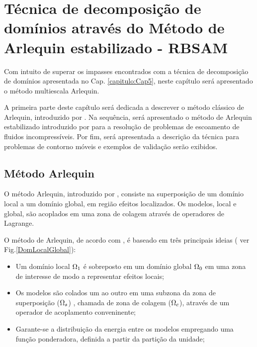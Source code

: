 \documentclass[tese_patricia]{subfiles}
\begin{document}

\chapter[Método de Arlequin estabilizado]{Técnica de decomposição de domínios através do Método de Arlequin estabilizado - RBSAM} \label{capitulo:Cap6}

Com intuito de superar os impasses encontrados com a técnica de decomposição de domínios apresentada no Cap. \ref{capitulo:Cap5}, neste capítulo será apresentado o método multiescala Arlequin.

A primeira parte deste capítulo será dedicada a descrever o método clássico de Arlequin, introduzido por . Na sequência, será apresentado o método de Arlequin estabilizado introduzido por   para a resolução de problemas de escoamento de fluidos incompressíveis. Por fim, será apresentada a descrição da técnica para problemas de contorno móveis e exemplos de validação serão exibidos.

\section{Método Arlequin}

O método Arlequin, introduzido por , consiste na superposição de um domínio local a um domínio global, em região efeitos localizados. Os modelos, local e global, são acoplados em uma zona de colagem através de operadores de Lagrange. 

O  método de Arlequin, de acordo com , é baseado em três principais ideias ( ver Fig.\ref{DomLocalGlobal}):

\begin{itemize}
	\item Um domínio local $\Omega_1$ é sobreposto em um domínio global  $\Omega_0$ em uma zona de interesse de modo a representar efeitos locais;
	\item Os modelos são colados um ao outro em uma subzona da zona de superposição ($\Omega_s$) , chamada de zona de colagem ($\Omega_c$), através de um operador de acoplamento conveninente;
	\item  Garante-se a distribuição da energia entre os modelos empregando uma função ponderadora, definida a partir da partição da unidade;
\end{itemize}
\end{document}
